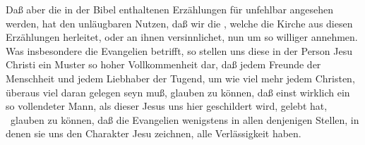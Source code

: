 \begin{aufza}
\item Daß aber die in der Bibel enthaltenen Erzählungen für unfehlbar angesehen werden, hat den unläugbaren Nutzen, daß wir die , welche die Kirche aus diesen Erzählungen herleitet, oder an ihnen versinnlichet, nun um so williger annehmen. Was insbesondere die Evangelien betrifft, so stellen uns diese in der Person Jesu Christi ein Muster so hoher Vollkommenheit dar, daß jedem Freunde der Menschheit und jedem Liebhaber der Tugend, um wie viel mehr jedem Christen, überaus viel daran gelegen seyn muß, glauben zu können, daß einst wirklich ein so vollendeter Mann, als dieser Jesus uns hier geschildert wird, gelebt hat, \dh\ glauben zu können, daß die Evangelien wenigstens in allen denjenigen Stellen, in denen sie uns den Charakter Jesu zeichnen, alle Verlässigkeit haben.
\end{aufza}


